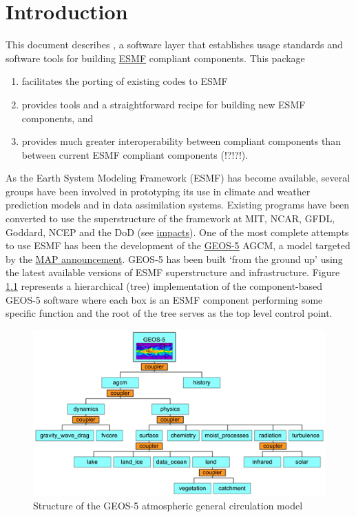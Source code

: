 \chapter{Introduction}
\minitoc
This document describes \ggn, a software layer that
establishes usage standards and software tools for building 
\href{http://www.earthsystemmodeling.org}{ESMF}
compliant components. This package
\begin{enumerate}
\item facilitates the porting of existing codes to ESMF
\item provides tools and a straightforward recipe for building new ESMF
components, and
\item provides much greater interoperability between compliant
components than between current ESMF compliant components (!?!?!).
\end{enumerate}

As the Earth System Modeling Framework (ESMF)
has become available, several groups have been involved in prototyping
its use in climate and weather prediction models and in data
assimilation systems.  Existing programs have been converted to use
the superstructure of the framework at MIT, NCAR, GFDL, Goddard,
NCEP and the DoD (see 
\href{http://www.earthsystemmodeling.org/impacts/index.shtml}{impacts}).
One of the
most complete attempts to use ESMF has been the development of the
\href{http://geos5.org}{GEOS-5} AGCM, a model targeted by the
\href{http://map.nasa.gov}{MAP announcement}. GEOS-5 has been
built `from the ground up' using the latest available versions of ESMF
superstructure and infrastructure. Figure \ref{fig:geos5_esmf} represents a
hierarchical (tree) implementation of the component-based GEOS-5 software
where each box is an ESMF component performing some specific function and
the root of the tree serves as the top level control point.
%
\begin{figure}[h]
  \label{fig:geos5_esmf}
  \centering
  \includegraphics[scale=0.75]{figs/geos5_esmf.jpg}
  \caption{Structure of the GEOS-5 atmospheric general circulation model}
\end{figure}
%

